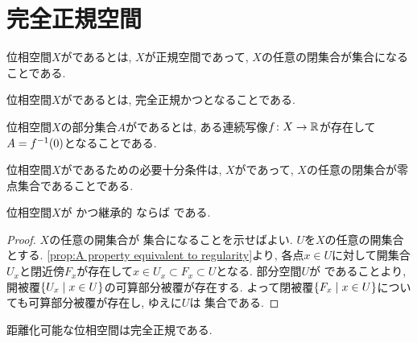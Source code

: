 \documentclass[uplatex, dvipdfmx, a4paper, 12pt, class=jsbook, crop=false]{standalone}
\begin{document}
\section{完全正規空間}
\label{sec:perfectly-normal-spaces}

\begin{definition}
	位相空間$ X $がであるとは,
	$ X $が正規空間であって,
	$ X $の任意の閉集合が\Gdelta 集合になることである.
\end{definition}

\begin{definition}
	位相空間$ X $がであるとは,
	完全正規かつとなることである.
\end{definition}

\begin{definition}
	位相空間$ X $の部分集合$ A $がであるとは,
	ある連続写像$ f\colon X\to\mathbb{R} $が存在して$ A = \mapinvpt{f}{0} $となることである.
\end{definition}

\begin{proposition}
	位相空間\(X\)がであるための必要十分条件は,
	\(X\)がであって,
	\(X\)の任意の閉集合が零点集合であることである.
\end{proposition}

\begin{proposition}
	\label{prop:T_3 + hLind. implies T_6}
	位相空間$X$が かつ継承的 \Lindelof ならば である.
\end{proposition}
\begin{proof}
	$X$の任意の開集合が \Fsigma 集合になることを示せばよい.
	$U$を$X$の任意の開集合とする.
	\ref{prop:A property equivalent to regularity}より,
	各点$x \in U$に対して開集合$U_x$と閉近傍$F_x$が存在して$x \in U_x \subset F_x \subset U$となる.
	部分空間$U$が \Lindelof であることより,
	開被覆$\setcomp{U_x}{x \in U}$の可算部分被覆が存在する.
	よって閉被覆$\setcomp{F_x}{x \in U}$についても可算部分被覆が存在し,
	ゆえに$U$は \Fsigma 集合である.
\end{proof}

\begin{proposition}
	距離化可能な位相空間は完全正規である.
\end{proposition}
\end{document}
